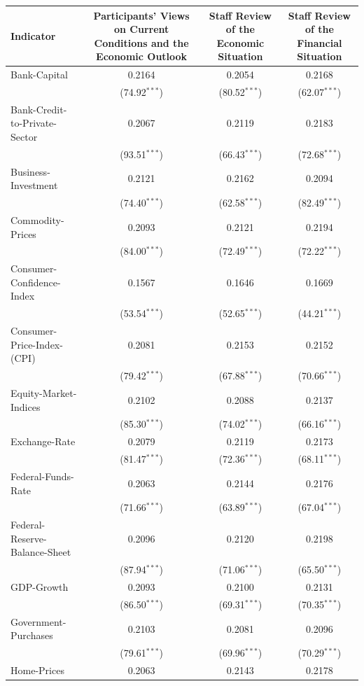 \begin{tabular}{lccc}
\hline
Indicator & Participants' Views on Current Conditions and the Economic Outlook & Staff Review of the Economic Situation & Staff Review of the Financial Situation \\
\hline
Bank-Capital & 0.2164 & 0.2054 & 0.2168 \\
 & (74.92$^{***}$) & (80.52$^{***}$) & (62.07$^{***}$) \\
Bank-Credit-to-Private-Sector & 0.2067 & 0.2119 & 0.2183 \\
 & (93.51$^{***}$) & (66.43$^{***}$) & (72.68$^{***}$) \\
Business-Investment & 0.2121 & 0.2162 & 0.2094 \\
 & (74.40$^{***}$) & (62.58$^{***}$) & (82.49$^{***}$) \\
Commodity-Prices & 0.2093 & 0.2121 & 0.2194 \\
 & (84.00$^{***}$) & (72.49$^{***}$) & (72.22$^{***}$) \\
Consumer-Confidence-Index & 0.1567 & 0.1646 & 0.1669 \\
 & (53.54$^{***}$) & (52.65$^{***}$) & (44.21$^{***}$) \\
Consumer-Price-Index-(CPI) & 0.2081 & 0.2153 & 0.2152 \\
 & (79.42$^{***}$) & (67.88$^{***}$) & (70.66$^{***}$) \\
Equity-Market-Indices & 0.2102 & 0.2088 & 0.2137 \\
 & (85.30$^{***}$) & (74.02$^{***}$) & (66.16$^{***}$) \\
Exchange-Rate & 0.2079 & 0.2119 & 0.2173 \\
 & (81.47$^{***}$) & (72.36$^{***}$) & (68.11$^{***}$) \\
Federal-Funds-Rate & 0.2063 & 0.2144 & 0.2176 \\
 & (71.66$^{***}$) & (63.89$^{***}$) & (67.04$^{***}$) \\
Federal-Reserve-Balance-Sheet & 0.2096 & 0.2120 & 0.2198 \\
 & (87.94$^{***}$) & (71.06$^{***}$) & (65.50$^{***}$) \\
GDP-Growth & 0.2093 & 0.2100 & 0.2131 \\
 & (86.50$^{***}$) & (69.31$^{***}$) & (70.35$^{***}$) \\
Government-Purchases & 0.2103 & 0.2081 & 0.2096 \\
 & (79.61$^{***}$) & (69.96$^{***}$) & (70.29$^{***}$) \\
Home-Prices & 0.2063 & 0.2143 & 0.2178 \\

\end{tabular}
